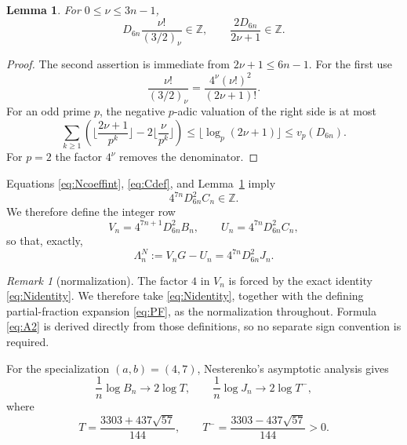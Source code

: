 \documentclass[11pt]{article}
\newtheorem{lemma}[theorem]{Lemma}
\theoremstyle{definition}
\theoremstyle{remark}
\newtheorem{remark}[theorem]{Remark}
\newcommand{\Z}{\mathbb Z}
\begin{document}
\begin{lemma}\label{lem:hclear}
For $0\le\nu\le3n-1$,
\[
D_{6n}\frac{\nu!}{(3/2)_\nu}\in\Z,
\qquad
\frac{2D_{6n}}{2\nu+1}\in\Z.
\]
\end{lemma}
\begin{proof}
The second assertion is immediate from $2\nu+1\le6n-1$.  For the first use
\[
\frac{\nu!}{(3/2)_\nu}=\frac{4^\nu(\nu!)^2}{(2\nu+1)!}.
\]
For an odd prime $p$, the negative $p$-adic valuation of the right side is at most
\[
\sum_{k\ge1}
\left(\Big\lfloor\frac{2\nu+1}{p^k}\Big\rfloor
-2\Big\lfloor\frac{\nu}{p^k}\Big\rfloor\right)
\le \lfloor\log_p(2\nu+1)\rfloor
\le v_p(D_{6n}).
\]
For $p=2$ the factor $4^\nu$ removes the denominator.
\end{proof}

Equations \eqref{eq:Ncoeffint}, \eqref{eq:Cdef}, and Lemma~\ref{lem:hclear} imply
\[
4^{7n}D_{6n}^2C_n\in\Z.
\]
We therefore define the integer row
\begin{equation}\label{eq:Nrow}
V_n=4^{7n+1}D_{6n}^2B_n,\qquad
U_n=4^{7n}D_{6n}^2C_n,
\end{equation}
so that, exactly,
\begin{equation}\label{eq:Nlin}
\Lambda_n^N:=V_nG-U_n=4^{7n}D_{6n}^2J_n.
\end{equation}

\begin{remark}[normalization]
The factor $4$ in $V_n$ is forced by the exact identity \eqref{eq:Nidentity}.  We therefore take \eqref{eq:Nidentity}, together with the defining partial-fraction expansion \eqref{eq:PF}, as the normalization throughout.  Formula \eqref{eq:A2} is derived directly from those definitions, so no separate sign convention is required.
\end{remark}

For the specialization $(a,b)=(4,7)$, Nesterenko's asymptotic analysis gives
\begin{equation}\label{eq:Nrawrates}
\frac1n\log B_n\to2\log T,\qquad
\frac1n\log J_n\to2\log T^-,
\end{equation}
where
\[
T=\frac{3303+437\sqrt{57}}{144},\qquad
T^-=\frac{3303-437\sqrt{57}}{144}>0.
\]
\end{document}
